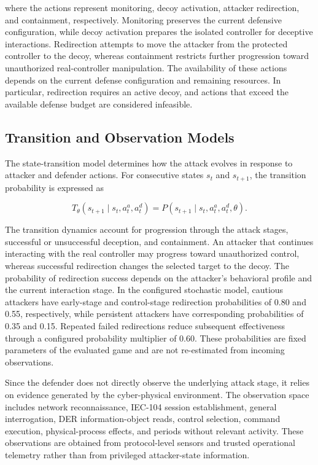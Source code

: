 \documentclass[10pt,conference]{IEEEtran}
\begin{document}
\noindent
where the actions represent monitoring, decoy activation, attacker redirection, and containment, respectively. Monitoring preserves the current defensive configuration, while decoy activation prepares the isolated controller for deceptive interactions. Redirection attempts to move the attacker from the protected controller to the decoy, whereas containment restricts further progression toward unauthorized real-controller manipulation. The availability of these actions depends on the current defense configuration and remaining resources. In particular, redirection requires an active decoy, and actions that exceed the available defense budget are considered infeasible.

\subsection{Transition and Observation Models}

The state-transition model determines how the attack evolves in response to attacker and defender actions. For consecutive states $s_t$ and $s_{t+1}$, the transition probability is expressed as

\begin{equation}
T_{\theta}(s_{t+1}\mid s_t,a_t^{a},a_t^{d})
=
P(s_{t+1}\mid s_t,a_t^{a},a_t^{d},\theta).
\label{eq:transition_model}
\end{equation}

\noindent
The transition dynamics account for progression through the attack stages, successful or unsuccessful deception, and containment. An attacker that continues interacting with the real controller may progress toward unauthorized control, whereas successful redirection changes the selected target to the decoy. The probability of redirection success depends on the attacker's behavioral profile and the current interaction stage. In the configured stochastic model, cautious attackers have early-stage and control-stage redirection probabilities of 0.80 and 0.55, respectively, while persistent attackers have corresponding probabilities of 0.35 and 0.15. Repeated failed redirections reduce subsequent effectiveness through a configured probability multiplier of 0.60. These probabilities are fixed parameters of the evaluated game and are not re-estimated from incoming observations.

Since the defender does not directly observe the underlying attack stage, it relies on evidence generated by the cyber-physical environment. The observation space includes network reconnaissance, IEC-104 session establishment, general interrogation, DER information-object reads, control selection, command execution, physical-process effects, and periods without relevant activity. These observations are obtained from protocol-level sensors and trusted operational telemetry rather than from privileged attacker-state information.
\end{document}
